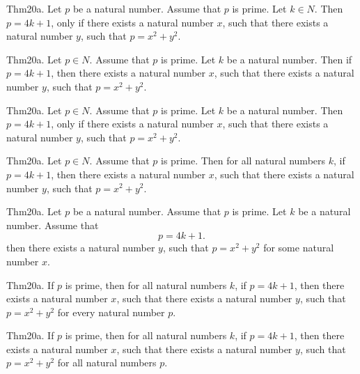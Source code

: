 \documentclass{article}
\begin{document}
Thm20a. Let $p$ be a natural number. Assume that $p$ is prime. Let $k \in N$. Then $p = 4 k + 1$, only if there exists a natural number $x$, such that there exists a natural number $y$, such that $p = x ^{ 2}+ y ^{ 2}$.

Thm20a. Let $p \in N$. Assume that $p$ is prime. Let $k$ be a natural number. Then if $p = 4 k + 1$, then there exists a natural number $x$, such that there exists a natural number $y$, such that $p = x ^{ 2}+ y ^{ 2}$.

Thm20a. Let $p \in N$. Assume that $p$ is prime. Let $k$ be a natural number. Then $p = 4 k + 1$, only if there exists a natural number $x$, such that there exists a natural number $y$, such that $p = x ^{ 2}+ y ^{ 2}$.

Thm20a. Let $p \in N$. Assume that $p$ is prime. Then for all natural numbers $k$, if $p = 4 k + 1$, then there exists a natural number $x$, such that there exists a natural number $y$, such that $p = x ^{ 2}+ y ^{ 2}$.

Thm20a. Let $p$ be a natural number. Assume that $p$ is prime. Let $k$ be a natural number. Assume that $$p = 4 k + 1.$$ then there exists a natural number $y$, such that $p = x ^{ 2}+ y ^{ 2}$ for some natural number $x$.

Thm20a. If $p$ is prime, then for all natural numbers $k$, if $p = 4 k + 1$, then there exists a natural number $x$, such that there exists a natural number $y$, such that $p = x ^{ 2}+ y ^{ 2}$ for every natural number $p$.

Thm20a. If $p$ is prime, then for all natural numbers $k$, if $p = 4 k + 1$, then there exists a natural number $x$, such that there exists a natural number $y$, such that $p = x ^{ 2}+ y ^{ 2}$ for all natural numbers $p$.
\end{document}
